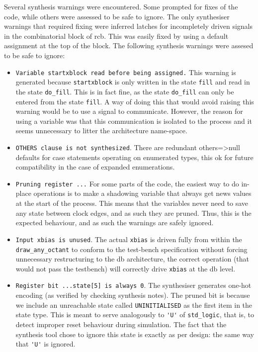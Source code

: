 \documentclass[]{article}
\begin{document}
Several synthesis warnings were encountered. Some prompted for fixes of the code, while others were assessed to be safe to ignore. The only synthesiser warnings that required fixing were inferred latches for incompletely driven signals in the combinatorial block of rcb. This was easily fixed by using a default assignment at the top of the block. The following synthesis warnings were assesed to be safe to ignore:
\begin{itemize}
	\item \verb"Variable startxblock read before being assigned." This warning is generated because \verb"startxblock" is only written in the state \verb"fill" and read in the state \verb"do_fill". This is in fact fine, as the state \verb"do_fill" can only be entered from the state \verb"fill". A way of doing this that would avoid raising this warning would be to use a signal to communicate. However, the reason for using a variable was that this communication is isolated to the process and it seems unnecessary to litter the architecture name-space.
	\item \verb"OTHERS clause is not synthesized". There are redundant others=>null defaults for case statements operating on enumerated types, this ok for future compatibility in the case of expanded enumerations.
	\item \verb"Pruning register ..." For some parts of the code, the easiest way to do in-place operations is to make a shadowing variable that always get news values at the start of the process. This means that the variables never need to save any state between clock edges, and as such they are pruned. Thus, this is the expected behaviour, and as such the warnings are safely ignored.
	\item \verb"Input xbias is unused". The actual \verb"xbias" is driven fully from within the \verb"draw_any_octant" to conform to the test-bench specification without forcing unnecessary restructuring to the db architecture, the correct operation (that would not pass the testbench) will correctly drive \verb"xbias"  at the db level.
	\item \verb"Register bit ...state[5] is always 0". The synthesiser generates one-hot encoding (as verified by checking synthesis notes). The pruned bit is because we include an unreachable state called \verb"UNINITIALISED" as the first item in the state type. This is meant to serve analogously to \verb"'U'" of \verb"std_logic", that is, to detect improper reset behaviour during simulation. The fact that the synthesis tool chose to ignore this state is exactly as per design: the same way that \verb"'U'" is ignored.
\end{itemize}
\end{document}
